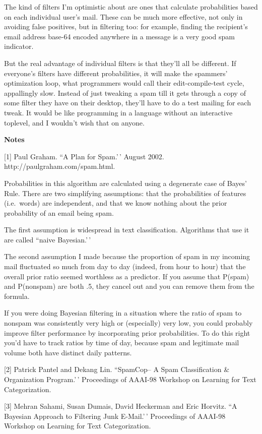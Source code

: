 The kind of filters I'm optimistic about are ones that calculate
probabilities based on each individual user's mail. These can be much
more effective, not only in avoiding false positives, but in filtering
too: for example, finding the recipient's email address base-64 encoded
anywhere in a message is a very good spam indicator.

But the real advantage of individual filters is that they'll all be
different. If everyone's filters have different probabilities, it will
make the spammers' optimization loop, what programmers would call their
edit-compile-test cycle, appallingly slow. Instead of just tweaking a
spam till it gets through a copy of some filter they have on their
desktop, they'll have to do a test mailing for each tweak. It would be
like programming in a language without an interactive toplevel, and I
wouldn't wish that on anyone.

\textbf{Notes}

{[}1{]} Paul Graham. ``A Plan for Spam.'\,' August 2002.
http://paulgraham.com/spam.html.

Probabilities in this algorithm are calculated using a degenerate case
of Bayes' Rule. There are two simplifying assumptions: that the
probabilities of features (i.e.~words) are independent, and that we know
nothing about the prior probability of an email being spam.

The first assumption is widespread in text classification. Algorithms
that use it are called ``naive Bayesian.'\,'

The second assumption I made because the proportion of spam in my
incoming mail fluctuated so much from day to day (indeed, from hour to
hour) that the overall prior ratio seemed worthless as a predictor. If
you assume that P(spam) and P(nonspam) are both .5, they cancel out and
you can remove them from the formula.

If you were doing Bayesian filtering in a situation where the ratio of
spam to nonspam was consistently very high or (especially) very low, you
could probably improve filter performance by incorporating prior
probabilities. To do this right you'd have to track ratios by time of
day, because spam and legitimate mail volume both have distinct daily
patterns.

{[}2{]} Patrick Pantel and Dekang Lin. ``SpamCop-- A Spam Classification
\& Organization Program.'\,' Proceedings of AAAI-98 Workshop on Learning
for Text Categorization.

{[}3{]} Mehran Sahami, Susan Dumais, David Heckerman and Eric Horvitz.
``A Bayesian Approach to Filtering Junk E-Mail.'\,' Proceedings of
AAAI-98 Workshop on Learning for Text Categorization.

